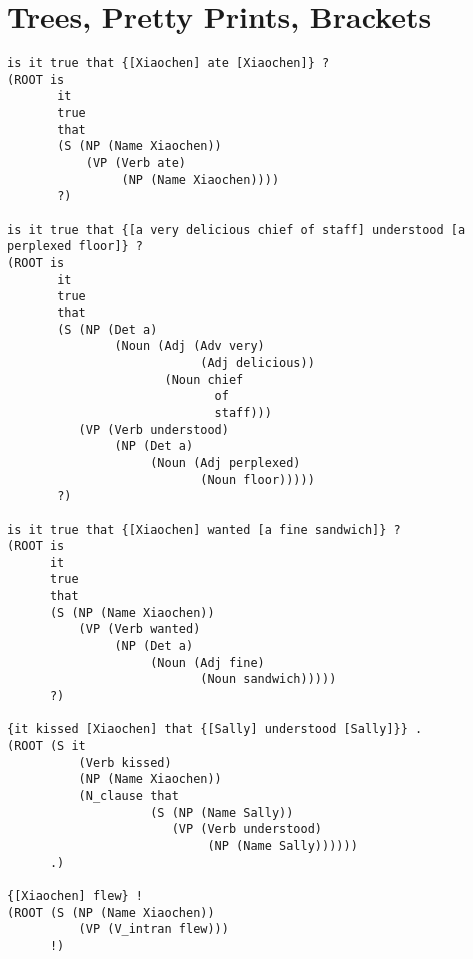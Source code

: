 \documentclass[11pt]{article}
\begin{document}
\newpage

\section{Trees, Pretty Prints, Brackets}
\begin{lstlisting}
is it true that {[Xiaochen] ate [Xiaochen]} ? 
(ROOT is 
       it 
       true 
       that 
       (S (NP (Name Xiaochen)) 
           (VP (Verb ate) 
                (NP (Name Xiaochen)))) 
       ?) 
       
is it true that {[a very delicious chief of staff] understood [a perplexed floor]} ? 
(ROOT is 
       it 
       true 
       that 
       (S (NP (Det a) 
               (Noun (Adj (Adv very) 
                           (Adj delicious)) 
                      (Noun chief 
                             of 
                             staff))) 
          (VP (Verb understood) 
               (NP (Det a) 
                    (Noun (Adj perplexed) 
                           (Noun floor))))) 
       ?) 
       
is it true that {[Xiaochen] wanted [a fine sandwich]} ? 
(ROOT is 
      it 
      true 
      that 
      (S (NP (Name Xiaochen)) 
          (VP (Verb wanted) 
               (NP (Det a) 
                    (Noun (Adj fine) 
                           (Noun sandwich))))) 
      ?) 
      
{it kissed [Xiaochen] that {[Sally] understood [Sally]}} . 
(ROOT (S it 
          (Verb kissed) 
          (NP (Name Xiaochen)) 
          (N_clause that 
                    (S (NP (Name Sally)) 
                       (VP (Verb understood) 
                            (NP (Name Sally)))))) 
      .) 
      
{[Xiaochen] flew} ! 
(ROOT (S (NP (Name Xiaochen)) 
          (VP (V_intran flew))) 
      !) 
\end{lstlisting}
\end{document}
